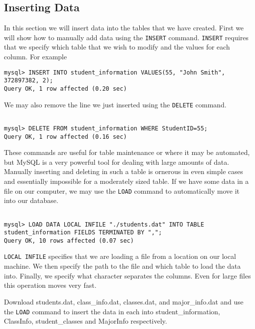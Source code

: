 {\subsection{Inserting Data}

In this section we will insert data into the tables that we have created.  First we will show how to manually add data using the {\tt INSERT} command.  {\tt INSERT} requires that we specify which table that we wish to modify and the values for each column.  For example

\begin{lstlisting}
mysql> INSERT INTO student_information VALUES(55, "John Smith", 372897382, 2);
Query OK, 1 row affected (0.20 sec)
\end{lstlisting}

We may also remove the line we just inserted using the {\tt DELETE} command.

\begin{lstlisting}

mysql> DELETE FROM student_information WHERE StudentID=55;
Query OK, 1 row affected (0.16 sec)

\end{lstlisting}

These commands are useful for table maintenance or where it may be automated, but MySQL is a very powerful tool for dealing with large amounts of data.  Manually inserting and deleting in such a table is ornerous in even simple cases and essentially impossible for a moderately sized table.  If we have some data in a file on our computer, we may use the {\tt LOAD} command to automatically move it into our database.

\begin{lstlisting}

mysql> LOAD DATA LOCAL INFILE "./students.dat" INTO TABLE student_information FIELDS TERMINATED BY ",";
Query OK, 10 rows affected (0.07 sec)

\end{lstlisting}

{\tt LOCAL INFILE} specifies that we are loading a file from a location on our local machine.  We then specify the path to the file and which table to load the data into.  Finally, we specify what character separates the columns.  Even for large files this operation moves very fast.

\begin{exercise}

Download students.dat, class_info.dat, classes.dat, and major_info.dat and use the {\tt LOAD} command to insert the data in each into student_information, ClassInfo, student_classes and MajorInfo respectively.


\end{exercise}}
